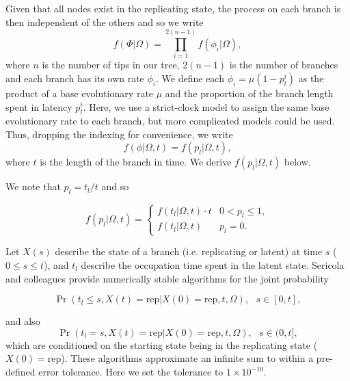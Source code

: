 \documentclass[11pt,a4paper]{article}
\begin{document}
Given that all nodes exist in the replicating state, the process on each branch is then independent of the others and so we write
\begin{equation}
f(\Phi|\Omega) = \prod_{i=1}^{2(n-1)}f(\phi_i|\Omega),
\end{equation}
where $n$ is the number of tips in our tree, $2(n-1)$ is the number of branches and each branch has its own rate $\phi_i$.
We define each $\phi_i = \mu (1-p^{i}_{l})$ as the product of a base evolutionary rate $\mu$ and the proportion of the branch length spent in latency $p^{i}_{l}$.
Here, we use a strict-clock model to assign the same base evolutionary rate to each branch, but more complicated models could be used.
Thus, dropping the indexing for convenience, we write
\begin{equation}
f(\phi|\Omega,t) =  f( p_{l}| \Omega,t ),
\end{equation}
where $t$ is the length of the branch in time. 
We derive $f(p_{l}|\Omega,t)$ below.

We note that $p_l = t_l/t$ and so 

\begin{equation}
f(p_l|\Omega,t)  = \begin{cases}
    f(t_l|\Omega,t) \cdot t & 0<p_l\leq1, \\
    f(t_l|\Omega,t) & p_l=0.
    \end{cases}
\end{equation}

Let $X(s)$ describe the state of a branch (i.e. replicating or latent) at time $s$ ($0\leq s\leq t$), and $t_{l}$ describe the occupation time spent in the latent state.
Sericola and colleagues \cite{Sericola2000-ph,Bladt2002-hg} provide numerically stable algorithms for the joint probability

\begin{equation}
\operatorname{Pr}(t_l\leq s,X(t)=\text{rep}|X(0)=\text{rep},t,\Omega), \text{ }s \in[0,t],
\end{equation}

and also
\begin{equation}
\operatorname{Pr}(t_l=s,X(t)=\text{rep}|X(0)=\text{rep},t,\Omega), \text{ }s  \in(0,t],
\end{equation}
which are conditioned on the starting state being in the replicating state ($X(0)=\text{rep}$).
These algorithms approximate an infinite sum to within a pre-defined error tolerance. 
Here we set the tolerance to $1\times 10^{-10}$.
\end{document}
